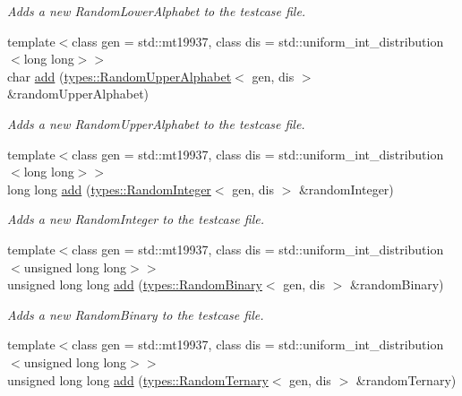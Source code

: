 \begin{DoxyCompactItemize}
\begin{DoxyCompactList}\small\item\em Adds a new Random\+Lower\+Alphabet to the testcase file. \end{DoxyCompactList}\item 
{\footnotesize template$<$class gen  = std\+::mt19937, class dis  = std\+::uniform\+\_\+int\+\_\+distribution$<$long long$>$$>$ }\\char \mbox{\hyperlink{classtestcaser_1_1maker_1_1TestCaseBuilder_a0d02a42731de8cffd9cc5be67d49290e}{add}} (\mbox{\hyperlink{classtestcaser_1_1maker_1_1types_1_1RandomUpperAlphabet}{types\+::\+Random\+Upper\+Alphabet}}$<$ gen, dis $>$ \&random\+Upper\+Alphabet)
\begin{DoxyCompactList}\small\item\em Adds a new Random\+Upper\+Alphabet to the testcase file. \end{DoxyCompactList}\item 
{\footnotesize template$<$class gen  = std\+::mt19937, class dis  = std\+::uniform\+\_\+int\+\_\+distribution$<$long long$>$$>$ }\\long long \mbox{\hyperlink{classtestcaser_1_1maker_1_1TestCaseBuilder_a2ef119caff9fb4bd1b313964af9e77e0}{add}} (\mbox{\hyperlink{classtestcaser_1_1maker_1_1types_1_1RandomInteger}{types\+::\+Random\+Integer}}$<$ gen, dis $>$ \&random\+Integer)
\begin{DoxyCompactList}\small\item\em Adds a new Random\+Integer to the testcase file. \end{DoxyCompactList}\item 
{\footnotesize template$<$class gen  = std\+::mt19937, class dis  = std\+::uniform\+\_\+int\+\_\+distribution$<$unsigned long long$>$$>$ }\\unsigned long long \mbox{\hyperlink{classtestcaser_1_1maker_1_1TestCaseBuilder_ae00a78ee096f8e1b6a59469445a99b53}{add}} (\mbox{\hyperlink{structtestcaser_1_1maker_1_1types_1_1RandomBinary}{types\+::\+Random\+Binary}}$<$ gen, dis $>$ \&random\+Binary)
\begin{DoxyCompactList}\small\item\em Adds a new Random\+Binary to the testcase file. \end{DoxyCompactList}\item 
{\footnotesize template$<$class gen  = std\+::mt19937, class dis  = std\+::uniform\+\_\+int\+\_\+distribution$<$unsigned long long$>$$>$ }\\unsigned long long \mbox{\hyperlink{classtestcaser_1_1maker_1_1TestCaseBuilder_a4bab625f6da4431125ca3e9eb602eaad}{add}} (\mbox{\hyperlink{structtestcaser_1_1maker_1_1types_1_1RandomTernary}{types\+::\+Random\+Ternary}}$<$ gen, dis $>$ \&random\+Ternary)

\end{DoxyCompactItemize}
